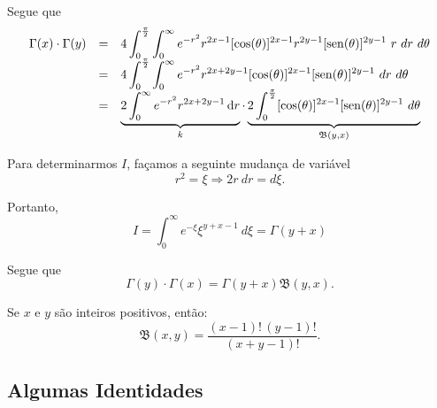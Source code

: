 Segue que
\[\begin{array}{rcl}
\Gamma(x)\cdot\Gamma(y)
&=& 4 \displaystyle\int_{0}^{\frac{\pi}{2}}\int_{0}^{\infty} e^{-r^2} r^{2x-1} [\cos(\theta)]^{2x-1} r^{2y-1} [\sin(\theta)]^{2y-1}\ r\ dr\ d\theta \\
&=& 4 \displaystyle\int_{0}^{\frac{\pi}{2}}\int_{0}^{\infty} e^{-r^2} r^{2x+2y-1} [\cos(\theta)]^{2x-1} [\sin(\theta)]^{2y-1}\ dr\ d\theta \\
&=& \underbrace{2\displaystyle\int_{0}^{\infty} e^{-r^2} r^{2x+2y-1} \dr}_{k} \cdot \underbrace{2\int_{0}^{\frac{\pi}{2}} [\cos(\theta)]^{2x-1} [\sin(\theta)]^{2y-1}\ d\theta}_{\mathfrak{B}(y,x)}
\end{array}\]

Para determinarmos \(I\), façamos a seguinte mudança de variável
\[r^2 = \xi \Rightarrow 2r\ dr = d\xi.\]

Portanto,
\[I = \displaystyle\int_{0}^{\infty} e^{-\xi} \xi^{y+x-1}\ d\xi = \Gamma(y+x)\]

Segue que
\[\Gamma(y) \cdot \Gamma(x) = \Gamma(y+x) \mathfrak{B}(y,x).\]

\begin{corollary}
Se \(x\) e \(y\) são inteiros positivos, então:
\begin{equation}
\displaystyle \mathfrak{B}(x,y) = \dfrac{(x-1)!\,(y-1)!}{(x+y-1)!}.
\end{equation}
\end{corollary}




\subsection{Algumas Identidades}

